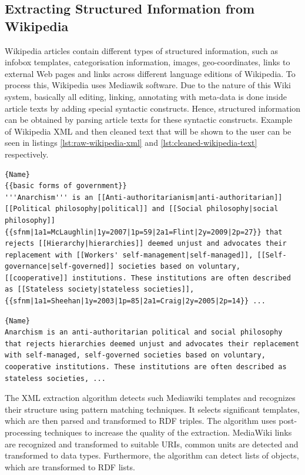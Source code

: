 \documentclass[thesis=M,english,hidelinks]{FITthesis}[2019/12/23]
\begin{document}
\subsection{Extracting Structured Information from Wikipedia}
Wikipedia articles contain different types of structured information, such as infobox templates, categorisation information, images, geo-coordinates, links to external Web pages and links across different language editions of Wikipedia. To process this, Wikipedia uses Mediawik software. Due to the nature of this  Wiki system, basically all editing, linking, annotating with meta-data is done inside article texts by adding special syntactic constructs. Hence, structured information can be obtained by parsing article texts for these syntactic constructs. Example of Wikipedia XML and then cleaned text that will be shown to the user can be seen in listings \ref{lst:raw-wikipedia-xml} and \ref{lst:cleaned-wikipedia-text} respectively. 

\begin{lstlisting}[caption=Raw Wikipedia XML,frame=tlrb,  label = {lst:raw-wikipedia-xml}]{Name}
{{basic forms of government}}
'''Anarchism''' is an [[Anti-authoritarianism|anti-authoritarian]] [[Political philosophy|political]] and [[Social philosophy|social philosophy]]{{sfnm|1a1=McLaughlin|1y=2007|1p=59|2a1=Flint|2y=2009|2p=27}} that rejects [[Hierarchy|hierarchies]] deemed unjust and advocates their replacement with [[Workers' self-management|self-managed]], [[Self-governance|self-governed]] societies based on voluntary, [[cooperative]] institutions. These institutions are often described as [[Stateless society|stateless societies]],{{sfnm|1a1=Sheehan|1y=2003|1p=85|2a1=Craig|2y=2005|2p=14}} ...
\end{lstlisting}

\begin{lstlisting}[caption=Cleaned Wikipedia text,frame=tlrb, label = {lst:cleaned-wikipedia-text}]{Name}
Anarchism is an anti-authoritarian political and social philosophy that rejects hierarchies deemed unjust and advocates their replacement with self-managed, self-governed societies based on voluntary, cooperative institutions. These institutions are often described as stateless societies, ...
\end{lstlisting}

The XML extraction algorithm detects such Mediawiki templates and recognizes their structure using pattern matching techniques. It selects significant templates, which are then parsed and transformed to RDF triples. The algorithm uses post-processing techniques to increase the quality of the extraction. MediaWiki links are recognized and transformed to suitable URIs, common units are detected and transformed to data types. Furthermore, the algorithm can detect lists of objects, which are transformed to RDF lists.
\end{document}
